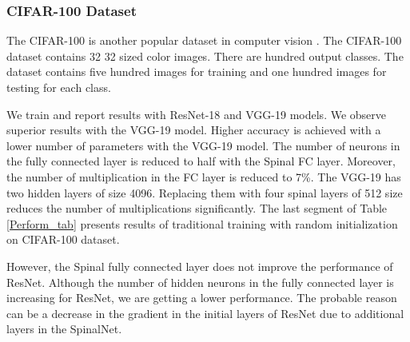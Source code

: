 \documentclass[journal]{IEEEtran}
\begin{document}
\subsubsection{CIFAR-100 Dataset}
The CIFAR-100 is another popular dataset in computer vision \cite{huang2019gpipe}. The CIFAR-100 dataset contains 32  32 sized color images. There are hundred output classes. The dataset contains five hundred images for training and one hundred images for testing for each class. 

We train and report results with ResNet-18 \cite{he2016deep} and VGG-19\cite{simonyan2014very} models. We observe superior results with the VGG-19 model. Higher accuracy is achieved with a lower number of parameters with the VGG-19 model.
The number of neurons in the fully connected layer is reduced to half with the Spinal FC layer. Moreover, the number of multiplication in the FC layer is reduced to 7\%. The VGG-19 has two hidden layers of size 4096. Replacing them with four spinal layers of 512 size reduces the number of multiplications significantly.
 The last segment of Table \ref{Perform_tab} presents results of traditional training with random initialization on CIFAR-100 dataset.
 
However, the Spinal fully connected layer does not improve the performance of ResNet. Although the number of hidden neurons in the fully connected layer is increasing for ResNet, we are getting a lower performance. The probable reason can be a decrease in the gradient in the initial layers of ResNet due to additional layers in the SpinalNet.
\end{document}
